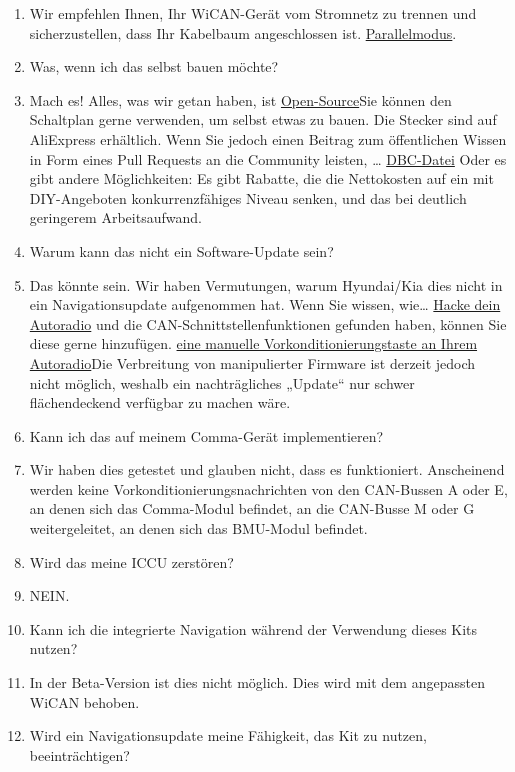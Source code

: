 \documentclass[superscriptaddress,onecolumn,floatfix]{revtex4-2}
\begin{document}
\begin{enumerate}
  \item[A:] Wir empfehlen Ihnen, Ihr WiCAN-Gerät vom Stromnetz zu trennen und sicherzustellen, dass Ihr Kabelbaum angeschlossen ist. \href{https://github.com/tylerharvey/Ioniq5_CAN/blob/main/guides/harnesses/head_unit_MITM/MITM_harness_modes.pdf}{Parallelmodus}.
  \item[Q:] Was, wenn ich das selbst bauen möchte?
  \item[A:] Mach es! Alles, was wir getan haben, ist \href{https://github.com/tylerharvey/Ioniq5_CAN}{Open-Source}Sie können den Schaltplan gerne verwenden, um selbst etwas zu bauen. Die Stecker sind auf AliExpress erhältlich. Wenn Sie jedoch einen Beitrag zum öffentlichen Wissen in Form eines Pull Requests an die Community leisten, … \href{https://github.com/dragz/egmpdbc}{DBC-Datei} Oder es gibt andere Möglichkeiten: Es gibt Rabatte, die die Nettokosten auf ein mit DIY-Angeboten konkurrenzfähiges Niveau senken, und das bei deutlich geringerem Arbeitsaufwand.
  \item[Q:] Warum kann das nicht ein Software-Update sein?
  \item[A:] Das könnte sein. Wir haben Vermutungen, warum Hyundai/Kia dies nicht in ein Navigationsupdate aufgenommen hat. Wenn Sie wissen, wie… \href{https://discord.gg/zyrngQ5qQ}{Hacke dein Autoradio} und die CAN-Schnittstellenfunktionen gefunden haben, können Sie diese gerne hinzufügen. \href{https://www.reddit.com/r/KiaEV6/comments/1jdd56u/comment/mid9xie/}{eine manuelle Vorkonditionierungstaste an Ihrem Autoradio}Die Verbreitung von manipulierter Firmware ist derzeit jedoch nicht möglich, weshalb ein nachträgliches „Update“ nur schwer flächendeckend verfügbar zu machen wäre.
  \item[Q:] Kann ich das auf meinem Comma-Gerät implementieren?
  \item[A:] Wir haben dies getestet und glauben nicht, dass es funktioniert. Anscheinend werden keine Vorkonditionierungsnachrichten von den CAN-Bussen A oder E, an denen sich das Comma-Modul befindet, an die CAN-Busse M oder G weitergeleitet, an denen sich das BMU-Modul befindet.
  \item[Q:] Wird das meine ICCU zerstören?
  \item[A:] NEIN.
  \item[Q:] Kann ich die integrierte Navigation während der Verwendung dieses Kits nutzen?
  \item[A:] In der Beta-Version ist dies nicht möglich. Dies wird mit dem angepassten WiCAN behoben.
  \item[Q:] Wird ein Navigationsupdate meine Fähigkeit, das Kit zu nutzen, beeinträchtigen?

\end{enumerate}
\end{document}
